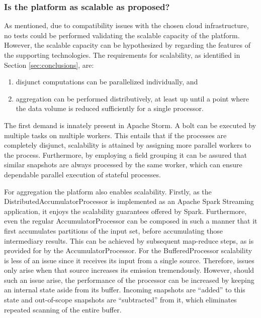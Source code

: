 \subsubsection{Is the platform as scalable as proposed?}
As mentioned, due to compatibility issues with the chosen cloud infrastructure, no tests could be performed validating the scalable capacity of the platform. However, the scalable capacity can be hypothesized by regarding the features of the supporting technologies. The requirements for scalability, as identified in Section \ref{sec:conclusions}, are:
\begin{enumerate}
\nospace
\item disjunct computations can be parallelized individually, and
\item aggregation can be performed distributively, at least up until a point where the data volume is reduced sufficiently for a single processor.
\end{enumerate}
The first demand is innately present in Apache Storm. A bolt can be executed by multiple tasks on multiple workers. This entails that if the processes are completely disjunct, scalability is attained by assigning more parallel workers to the process. Furthermore, by employing a field grouping it can be assured that similar snapshots are always processed by the same worker, which can ensure dependable parallel execution of stateful processes.

For aggregation the platform also enables scalability. Firstly, as the DistributedAccumulatorProcessor is implemented as an Apache Spark Streaming application, it enjoys the scalability guarantees offered by Spark. Furthermore, even the regular AccumulatorProcessor can be composed in such a manner that it first accumulates partitions of the input set, before accumulating those intermediary results. This can be achieved by subsequent map-reduce steps, as is provided for by the AccumulatorProcessor. For the BufferedProcessor scalability is less of an issue since it receives its input from a single source. Therefore, issues only arise when that source increases its emission tremendously. However, should such an issue arise, the performance of the processor can be increased by keeping an internal state aside from its buffer. Incoming snapshots are ``added'' to this state and out-of-scope snapshots are ``subtracted'' from it, which eliminates repeated scanning of the entire buffer.

